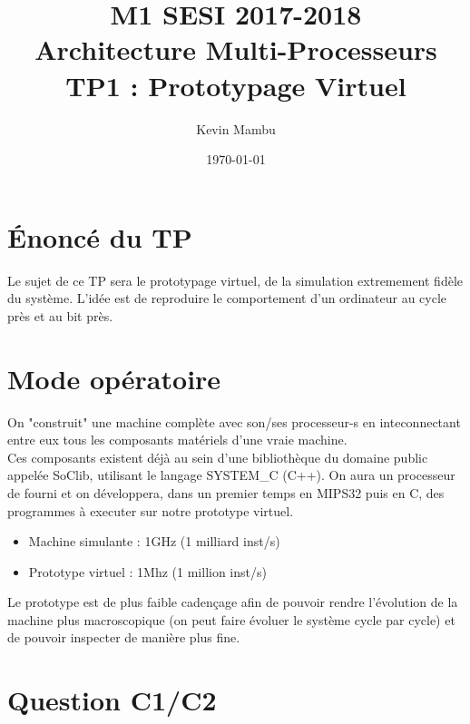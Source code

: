 \documentclass[10pt]{article}
\author{Kevin Mambu}
\date{\today}
\title{M1 SESI 2017-2018\\Architecture Multi-Processeurs\\TP1 : Prototypage Virtuel}
\begin{document}
\maketitle

\section{Énoncé du TP}
Le sujet de ce TP sera le prototypage virtuel, de la simulation extremement fidèle
du système.
L'idée est de reproduire le comportement d'un ordinateur au cycle près et au bit près.

\section{Mode opératoire}
On "construit" une machine complète avec son/ses processeur-s en inteconnectant
entre eux tous les composants matériels d'une vraie machine. \\
Ces composants existent déjà au sein d'une bibliothèque du domaine public appelée
SoClib, utilisant le langage SYSTEM\_C (C++). On aura un processeur de fourni et on
développera, dans un premier temps en MIPS32 puis en C, des programmes à executer
sur notre prototype virtuel.\\

\begin{itemize}
  \item Machine simulante : 1GHz (1 milliard inst/s)
  \item Prototype virtuel : 1Mhz (1 million inst/s)
\end{itemize}

Le prototype est de plus faible cadençage afin de pouvoir rendre l'évolution de la
machine plus macroscopique (on peut faire évoluer le système cycle par cycle) et de
pouvoir inspecter de manière plus fine.\\

\section{Question C1/C2}
\end{document}
